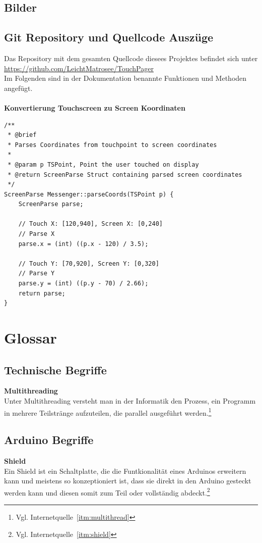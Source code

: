 \documentclass[a4paper, 11pt]{scrartcl}
\begin{document}
\begin{small}
\subsection{Bilder}



\subsection{Git Repository und Quellcode Auszüge}
Das Repository mit dem gesamten Quellcode diesees Projektes befindet sich unter
\\
\url{https://github.com/LeichtMatrosee/TouchPager}
\\
Im Folgenden sind in der Dokumentation benannte Funktionen und Methoden angefügt.
\\
\\
\textbf{Konvertierung Touchscreen zu Screen Koordinaten}\label{code:screenparse}
\begin{lstlisting}
/**
 * @brief 
 * Parses Coordinates from touchpoint to screen coordinates
 * 
 * @param p TSPoint, Point the user touched on display
 * @return ScreenParse Struct containing parsed screen coordinates
 */
ScreenParse Messenger::parseCoords(TSPoint p) {
    ScreenParse parse;
    
    // Touch X: [120,940], Screen X: [0,240]
    // Parse X
    parse.x = (int) ((p.x - 120) / 3.5);

    // Touch Y: [70,920], Screen Y: [0,320]
    // Parse Y
    parse.y = (int) ((p.y - 70) / 2.66);
    return parse;
}
\end{lstlisting}

\end{small}
\newpage
\section{Glossar}
\subsection{Technische Begriffe}
\textbf{Multithreading\label{def:multithreading}}
\\
Unter Multithreading versteht man in der Informatik den Prozess, ein Programm in mehrere Teilstränge aufzuteilen, die parallel 
ausgeführt werden.\footnote{Vgl. Internetquelle~\ref{itm:multithread}}
\subsection{Arduino Begriffe}
\textbf{Shield\label{def:shield}}
\\
Ein Shield ist ein Schaltplatte, die die Funtkionalität eines Arduinos erweitern kann und meistens so konzeptioniert ist, dass sie direkt in den Arduino gesteckt werden kann und diesen somit
zum Teil oder vollständig abdeckt.\footnote{Vgl. Internetquelle~\ref{itm:shield}}
\newpage
\end{document}
